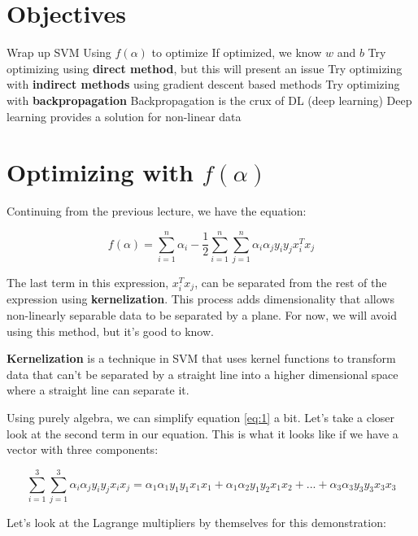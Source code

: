 \usepackage{tcolorbox} %

\section*{Objectives}
\begin{outline}
    \1 Wrap up SVM
    \1 Using $f(\alpha)$ to optimize
        \2 If optimized, we know $w$ and $b$
    \1 Try optimizing using \textbf{direct method}, but this will present an issue
    \1 Try optimizing with \textbf{indirect methods} using gradient descent based methods
    \1 Try optimizing with \textbf{backpropagation}
        \2 Backpropagation is the crux of DL (deep learning)
        \2 Deep learning provides a solution for non-linear data 

\end{outline}

\section*{Optimizing with $f(\alpha)$}

Continuing from the previous lecture, we have the equation:

\begin{equation} \label{eq:1}
f(\alpha) = \sum\limits_{i=1}^{n} \alpha_i - \frac{1}{2} \sum\limits_{i=1}^{n} \sum\limits_{j=1}^{n} \alpha_i \alpha_j y_i y_j x_i^T x_j
\end{equation}

The last term in this expression, $x_i^T x_j$, can be separated from the rest of the expression using \textbf{kernelization}. This process adds dimensionality that allows non-linearly separable data to be separated by a plane. For now, we will avoid using this method, but it's good to know.

\textbf{Kernelization} is a technique in SVM that uses kernel functions to transform data that can't be separated by a straight line into a higher dimensional space where a straight line can separate it.

Using purely algebra, we can simplify equation \ref{eq:1} a bit. Let's take a closer look at the second term in our equation. This is what it looks like if we have a vector with three components:

\[
\sum\limits_{i=1}^{3} \sum\limits_{j=1}^{3} \alpha_i \alpha_j y_i y_j x_i x_j = \alpha_1\alpha_1y_1y_1x_1x_1 + \alpha_1\alpha_2y_1y_2x_1x_2 + ... + \alpha_3\alpha_3y_3y_3x_3x_3
\]

Let's look at the Lagrange multipliers by themselves for this demonstration:

